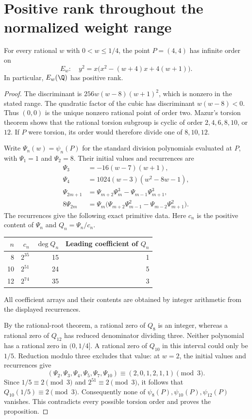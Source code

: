 \section{Positive rank throughout the normalized weight range}

\begin{proposition}\label{prop:smallcubic-rank}
For every rational $w$ with $0<w\le1/4$, the point $P=(4,4)$
has infinite order on
\[
 E_w:\quad y^2=x\bigl(x^2-(w+4)x+4(w+1)\bigr).
\]
In particular, $E_w(\Q)$ has positive rank.
\end{proposition}
\begin{proof}
The discriminant is $256w(w-8)(w+1)^2$, which is nonzero in the
stated range. The quadratic factor of the cubic has discriminant
$w(w-8)<0$. Thus $(0,0)$ is the unique nonzero rational point of
order two. Mazur's torsion theorem
\cite[Introduction, Theorem~(8), p.~35]{Mazur1977} shows that the
rational torsion subgroup is cyclic of order $2,4,6,8,10$, or $12$.
If $P$ were torsion, its order would therefore divide one of
$8,10,12$.

Write $\Psi_n(w)=\psi_n(P)$ for the standard division polynomials
evaluated at $P$, with $\Psi_1=1$ and $\Psi_2=8$. Their initial
values and recurrences are
\begin{align*}
 \Psi_3&=-16(w-7)(w+1),\\
 \Psi_4&=1024(w-3)(w^2-8w-1),\\
 \Psi_{2m+1}&=\Psi_{m+2}\Psi_m^3-
                     \Psi_{m-1}\Psi_{m+1}^3,\\
 8\Psi_{2m}&=\Psi_m\bigl(\Psi_{m+2}\Psi_{m-1}^2-
                     \Psi_{m-2}\Psi_{m+1}^2\bigr).
\end{align*}
The recurrences give the following exact primitive data. Here
$c_n$ is the positive content of $\Psi_n$ and $Q_n=\Psi_n/c_n$.
\begin{center}
\begin{tabular}{rrrr}\toprule
$n$&$c_n$&$\deg Q_n$&Leading coefficient of $Q_n$\\\midrule
8&$2^{35}$&15&1\\
10&$2^{51}$&24&5\\
12&$2^{74}$&35&3\\\bottomrule
\end{tabular}
\end{center}
All coefficient arrays and their contents are obtained by integer
arithmetic from the displayed recurrences.

By the rational-root theorem, a rational zero of $Q_8$ is an
integer, whereas a rational zero of $Q_{12}$ has reduced denominator
dividing three. Neither polynomial has a rational zero in
$(0,1/4]$. A rational zero of $Q_{10}$ in this interval could only
be $1/5$. Reduction modulo three excludes that value: at $w=2$,
the initial values and recurrences give
\[
 (\Psi_2,\Psi_3,\Psi_4,\Psi_5,\Psi_7,\Psi_{10})
                    \equiv(2,0,1,2,1,1)\pmod3.
\]
Since $1/5\equiv2\pmod3$ and $2^{51}\equiv2\pmod3$, it follows
that $Q_{10}(1/5)\equiv2\pmod3$. Consequently none of
$\psi_8(P),\psi_{10}(P),\psi_{12}(P)$ vanishes. This contradicts
every possible torsion order and proves the proposition.
\end{proof}

